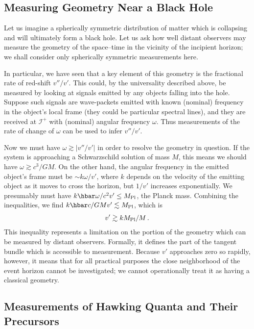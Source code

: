 \documentclass[
%
draft    %
,numberedheadings 
,bibliocites
  ]
  {aipproc}
\newcommand{\scrif}{{{\mathscr I}^{+}}}
\begin{document}
\subsection{Measuring Geometry Near a Black Hole}

Let us imagine a spherically symmetric distribution of matter which is collapsing and will ultimately form a black hole.  Let us ask how well distant observers may measure the geometry of the space--time in the vicinity of the incipient horizon; we shall consider only spherically symmetric measurements here.

In particular, we have seen that a key element of this geometry is the fractional rate of red-shift $v''/v'$.  This could, by the universality described above, be measured by looking at signals emitted by any objects falling into the hole. Suppose such signals are wave-packets emitted with known (nominal) frequency in the object's local frame (they could be particular spectral lines), and they are received at $\scrif$ with (nominal) angular frequency $\omega$.  Thus measurements of the rate of change of $\omega$ can be used to infer $v''/v'$.  

Now we must have $\omega\gtrsim |v''/v'|$ in order to resolve the geometry in question. If the system is approaching a Schwarzschild solution of mass $M$, this means we should have $\omega\gtrsim c^3/GM$.
On the other hand, the angular frequency in the emitted object's frame must be $\sim k\omega /v'$, where $k$ depends on the velocity of the emitting object as it moves to cross the horizon, but $1/v'$ increases exponentially.  We presumably must have $k\hbar \omega /c^2v'\leq M_{\rm Pl}$, the Planck mass. 
Combining the inequalities, we find $k\hbar c/GMv'\lesssim M_{\rm Pl}$, which is
\begin{equation}
  v'\gtrsim kM_{\rm Pl}/M\, .
\end{equation}
This inequality represents a limitation on the portion of the geometry which can be measured by distant observers.
Formally, it defines the part of the tangent bundle which is accessible to measurement.  Because $v'$ approaches zero so rapidly, however, it means that for all practical purposes the close neighborhood of the event horizon cannot be investigated; we cannot operationally treat it as having a classical geometry.

\subsection{Measurements of Hawking Quanta and Their Precursors}
\end{document}
